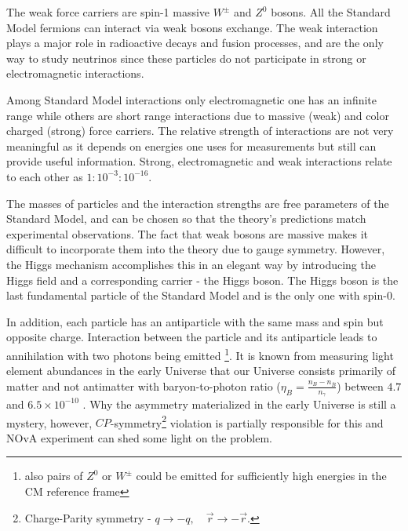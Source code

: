 The weak force carriers are spin-1 massive $W^\pm$ and $Z^0$ bosons. All the Standard Model fermions 
can interact via weak bosons exchange. The weak interaction plays a major role in radioactive decays and 
fusion processes, and are the only way to study neutrinos since these particles do not participate in strong or
electromagnetic interactions.

Among Standard Model interactions only electromagnetic one has an infinite range while others
are short range interactions due to massive (weak) and color charged (strong) force carriers. 
The relative strength of interactions are not very meaningful as it depends on energies one uses
for measurements but still can provide useful information. Strong, electromagnetic and weak interactions
relate to each other as $1:10^{-3}:10^{-16}$.

The masses of particles and the interaction strengths are free parameters of the Standard Model, and
can be chosen so that the theory's predictions match experimental observations. The fact that weak bosons
are massive makes it difficult to incorporate them into the theory due to gauge symmetry. However, the
Higgs mechanism accomplishes this in an elegant way by introducing the Higgs field and a corresponding
carrier - the Higgs boson. The Higgs boson is the last fundamental particle of the Standard Model and
is the only one with spin-0.

In addition, each particle has an antiparticle with the same mass and spin but opposite charge. 
Interaction between the particle and its antiparticle leads to annihilation with two photons being emitted
\footnote{also pairs of $Z^0$ or $W^\pm$ could be emitted for sufficiently high energies in the CM reference frame}.
It is known from measuring light element abundances in the early Universe that our Universe consists primarily 
of matter and not antimatter with baryon-to-photon ratio ($\eta_B = \frac{n_B - n_{\bar{B}}}{n_\gamma}$) between
$4.7$ and $6.5\times 10^{-10}$ \cite{barionratio}. Why the asymmetry materialized in the early Universe is
still a mystery, however, $CP$-symmetry\footnote{Charge-Parity symmetry - $q \rightarrow -q, \quad 
\vec{r} \rightarrow -\vec{r}$.} violation is partially responsible for this and NOvA experiment can 
shed some light on the problem. 


